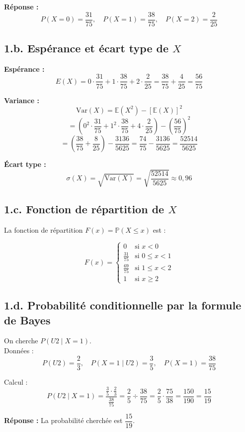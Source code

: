 \documentclass[12pt]{article}
\begin{document}
\textbf{Réponse :}
\[
P(X = 0) = \frac{31}{75}, \quad P(X = 1) = \frac{38}{75}, \quad P(X = 2) = \frac{2}{25}
\]

\subsection*{1.b. Espérance et écart type de $X$}

\textbf{Espérance :}
\[
E(X) = 0 \cdot \frac{31}{75} + 1 \cdot \frac{38}{75} + 2 \cdot \frac{2}{25} = \frac{38}{75} + \frac{4}{25} = \frac{56}{75}
\]

\textbf{Variance :}
\[
\text{Var}(X) = \mathbb{E}(X^2) - \left[\mathbb{E}(X)\right]^2
\]
\[
= \left(0^2 \cdot \frac{31}{75} + 1^2 \cdot \frac{38}{75} + 4 \cdot \frac{2}{25} \right) - \left( \frac{56}{75} \right)^2
\]
\[
= \left( \frac{38}{75} + \frac{8}{25} \right) - \frac{3136}{5625} = \frac{74}{75} - \frac{3136}{5625} = \frac{52514}{5625}
\]

\textbf{Écart type :}
\[
\sigma(X) = \sqrt{\text{Var}(X)} = \sqrt{\frac{52514}{5625}} \approx 0{,}96
\]

\subsection*{1.c. Fonction de répartition de $X$}

La fonction de répartition \( F(x) = \mathbb{P}(X \leq x) \) est :

\[
F(x) =
\begin{cases}
0 & \text{si } x < 0 \\
\frac{31}{75} & \text{si } 0 \leq x < 1 \\
\frac{69}{75} & \text{si } 1 \leq x < 2 \\
1 & \text{si } x \geq 2
\end{cases}
\]

\subsection*{1.d. Probabilité conditionnelle par la formule de Bayes}

On cherche \( P(U2 \mid X=1) \).\\
Données :
\[
P(U2) = \frac{2}{3}, \quad P(X=1 \mid U2) = \frac{3}{5}, \quad P(X=1) = \frac{38}{75}
\]

Calcul :
\[
P(U2 \mid X=1) = \frac{ \frac{3}{5} \cdot \frac{2}{3} }{ \frac{38}{75} } = \frac{2}{5} \div \frac{38}{75} = \frac{2}{5} \cdot \frac{75}{38} = \frac{150}{190} = \frac{15}{19}
\]

\textbf{Réponse :} La probabilité cherchée est \( \boxed{\dfrac{15}{19}} \).
\end{document}

